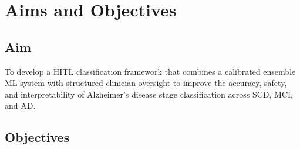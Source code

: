 \documentclass[12pt, a4paper]{report}
\begin{document}
  \section{Aims and Objectives}
  \label{sec:aims}

  \subsection*{Aim}

  To develop a HITL classification framework that combines a calibrated ensemble ML
  system with structured clinician oversight to improve the accuracy, safety, and
  interpretability of Alzheimer's disease stage classification across SCD, MCI, and AD.

  \subsection*{Objectives}
\end{document}
